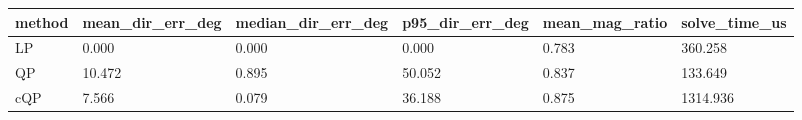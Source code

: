 \begin{tabular}{llllll}
\hline
method & mean\_dir\_err\_deg & median\_dir\_err\_deg & p95\_dir\_err\_deg & mean\_mag\_ratio & solve\_time\_us \\
\hline
LP & 0.000 & 0.000 & 0.000 & 0.783 & 360.258 \\
QP & 10.472 & 0.895 & 50.052 & 0.837 & 133.649 \\
cQP & 7.566 & 0.079 & 36.188 & 0.875 & 1314.936 \\
\hline
\end{tabular}
